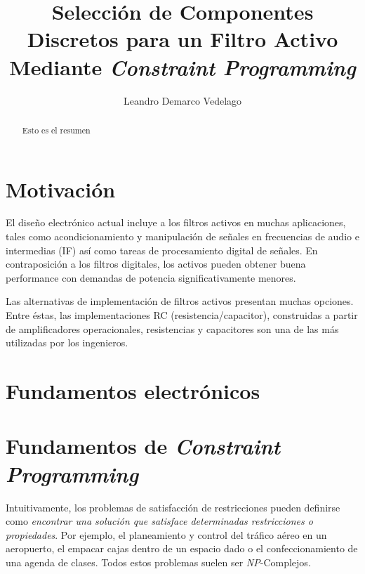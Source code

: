 \documentclass{llncs}
\title{Selecci\'on de Componentes Discretos para un Filtro Activo Mediante
  \textit{Constraint Programming}}
\author{Leandro Demarco Vedelago}
\institute{
            \email{leandrodemarco@gmail.com}\\
            Universidad Nacional de C\'ordoba, Fa.M.A.F
          }
\begin{document}
{\def\addcontentsline#1#2#3{}\maketitle
  \noindent
  }
  
\begin{abstract}
  Esto es el resumen 
\end{abstract}

\tableofcontents
\newpage
  \section{\textbf{Motivaci\'on}}
    \label{sec:motivacion}
    El dise\~no electr\'onico actual incluye a los filtros activos en muchas aplicaciones,
    tales como acondicionamiento y manipulaci\'on de se\~nales en frecuencias de audio e
    intermedias (IF) as\'i como tareas de procesamiento digital de se\~nales. En
    contraposici\'on a los filtros digitales, los activos pueden obtener buena performance
    con demandas de potencia significativamente menores.
    
    Las alternativas de implementaci\'on de filtros activos presentan muchas opciones.
    Entre \'estas, las implementaciones RC (resistencia/capacitor), construidas a partir de
    amplificadores operacionales, resistencias y capacitores son una de las m\'as utilizadas
    por los ingenieros.\cite{corr}
    
  \section{\textbf{Fundamentos electr\'onicos}}
    \label{sec:fundelect}
    
  \section{\textbf{Fundamentos de \textit{Constraint Programming}}}
    \label{sec:fundprog}
    Intuitivamente, los problemas de satisfacci\'on de restricciones pueden definirse como \textit{encontrar
    una soluci\'on que satisface determinadas restricciones o pro\-pie\-da\-des}.
    Por ejemplo, el planeamiento y control del tr\'afico a\'ereo en un aeropuerto, el empacar cajas dentro de un
    espacio dado o el confeccionamiento de una agenda de clases. 
    Todos estos problemas suelen ser \textit{NP}-Complejos.
    
\end{document}
